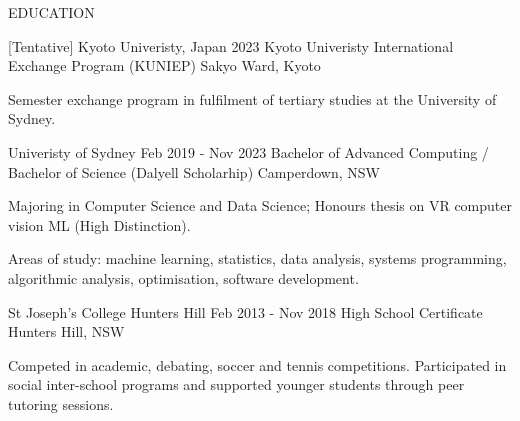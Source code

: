 
\begin{ResumeSection}{EDUCATION}

    \begin{DatedField}
        {[Tentative] Kyoto Univeristy, Japan}
        {2023}
        {Kyoto Univeristy International Exchange Program (KUNIEP)}
        {Sakyo Ward, Kyoto}
        \item Semester exchange program in fulfilment of tertiary studies at the University of Sydney.
    \end{DatedField}

    \begin{DatedField}
        {Univeristy of Sydney}
        {Feb 2019 - Nov 2023}
        {Bachelor of Advanced Computing / Bachelor of Science (Dalyell Scholarhip)}
        {Camperdown, NSW}
        \item Majoring in Computer Science and Data Science; Honours thesis on VR computer vision ML (High Distinction).
        \item Areas of study: machine learning, statistics, data analysis, systems programming, algorithmic analysis, optimisation, software development.
    \end{DatedField}

    \begin{DatedField}
        {St Joseph's College Hunters Hill}
        {Feb 2013 - Nov 2018}
        {High School Certificate}
        {Hunters Hill, NSW}
        \item Competed in academic, debating, soccer and tennis competitions. Participated in social inter-school programs and supported younger students through peer tutoring sessions.
    \end{DatedField}
    
\end{ResumeSection}